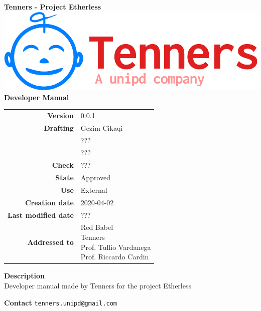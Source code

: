 \begin{titlepage}
	\begin{center}
		\large \textbf{Tenners - Project Etherless}
		\vfill
		\includegraphics[scale = 0.3]{./res/img/logo.png}\\
		\vfill
		\Huge \textbf{Developer Manual}

        \vfill
        \large

        \begin{tabular}{r|l}
                        \textbf{Version} & 0.0.1 \\
                        \textbf{Drafting} &
                        Gezim Cikaqi\\&
                        ???\\&
						???\\
                        \textbf{Check} &
                        ???\\
                        \textbf{State} & Approved \\
                        \textbf{Use} & External\\
                        \textbf{Creation date} &  2020-04-02\\
                        \textbf{Last modified date} &  ???\\
                        \textbf{Addressed to} & \parbox[t]{5cm}{Red Babel \\Tenners \\Prof. Tullio Vardanega \\Prof. Riccardo Cardin
                        							}
                \end{tabular}
                \vfill
                \normalsize
                \vfill
                                \textbf{Description}
                \\Developer manual made by Tenners for the project Etherless
                \vfill
                \normalsize
                \vfill
                
                \textbf{Contact}
                \texttt{tenners.unipd@gmail.com}

	\end{center}
\end{titlepage}
